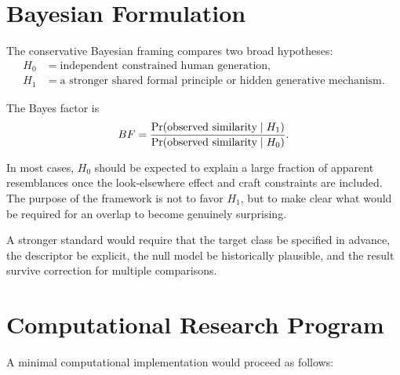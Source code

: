 \section{Bayesian Formulation}

The conservative Bayesian framing compares two broad hypotheses:
\begin{align}
    H_0 &= \text{independent constrained human generation},\\
    H_1 &= \text{a stronger shared formal principle or hidden generative mechanism}.
\end{align}

The Bayes factor is
\begin{equation}
    BF=\frac{\operatorname{Pr}(\text{observed similarity}\mid H_1)}{\operatorname{Pr}(\text{observed similarity}\mid H_0)}.
\end{equation}

In most cases, $H_0$ should be expected to explain a large fraction of apparent resemblances once the look-elsewhere effect and craft constraints are included. The purpose of the framework is not to favor $H_1$, but to make clear what would be required for an overlap to become genuinely surprising.

A stronger standard would require that the target class be specified in advance, the descriptor be explicit, the null model be historically plausible, and the result survive correction for multiple comparisons.

\section{Computational Research Program}

A minimal computational implementation would proceed as follows:

